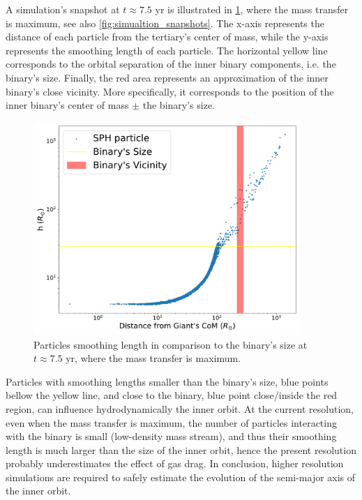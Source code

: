 A simulation's snapshot at $t \approx 7.5$ yr is illustrated in \cref{fig:resolution}, where the mass transfer is maximum, see also \cref{fig:simualtion_snapshots}. The x-axis represents the distance of each particle from the tertiary's center of mass, while the y-axis represents the smoothing length of each particle. The horizontal yellow line corresponds to the orbital separation of the inner binary components, i.e. the binary's size. Finally, the red area represents an approximation of the inner binary's close vicinity. More specifically, it corresponds to the position of the inner binary's center of mass $\pm$ the binary's size.
\begin{figure}[!htb]
    \centering
    \includegraphics[width=0.9\textwidth]{Thesis/graphs/resolution_benchmark.pdf}
    \caption{Particles smoothing length in comparison to the binary's size at $t \approx 7.5$ yr, where the mass transfer is maximum.}
    \label{fig:resolution}
\end{figure}
Particles with smoothing lengths smaller than the binary's size, blue points bellow the yellow line, and close to the binary, blue point close/inside the red region, can influence hydrodynamically the inner orbit. At the current resolution, even when the mass transfer is maximum, the number of particles interacting with the binary is small (low-density mass stream), and thus their smoothing length is much larger than the size of the inner orbit, hence the present resolution probably underestimates the effect of gas drag. In conclusion, higher resolution simulations are required to safely estimate the evolution of the semi-major axis of the inner orbit.

